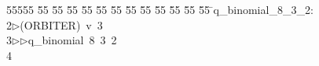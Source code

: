 %
%
\begin{tabbing}
55555 \= 55 \= 55 \= 55 \= 55 \= 55 \= 55 \= 55 \= 55 \= 55 \= 55 \= 55 \= 55 \= \>q\_binomial\_8\_3\_2:\\[0pt]
2\>$\triangleright$\>(ORBITER)\ v\ 3\ \\[0pt]
3\>$\triangleright$\>$\triangleright$\>q\_binomial\ 8\ 3\ 2\\[0pt]
4\>\end{tabbing}
